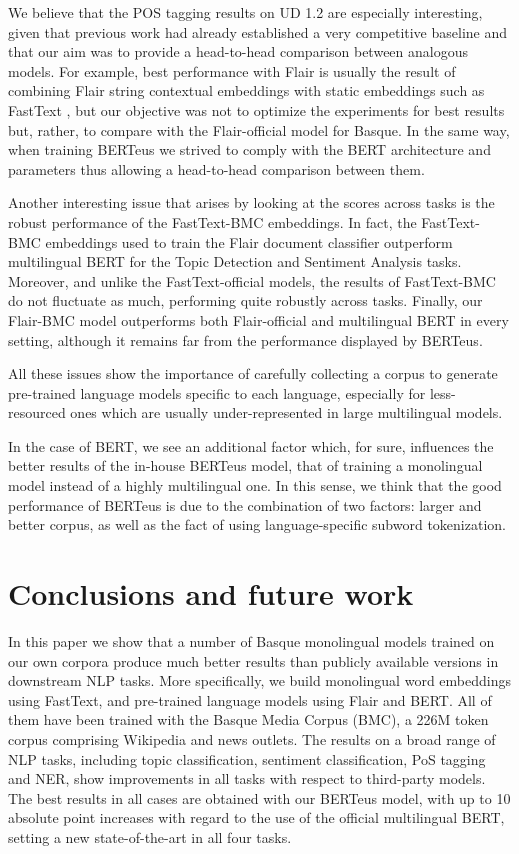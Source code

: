 \documentclass[10pt, a4paper]{article}
\begin{document}
We believe that the POS tagging results on UD 1.2 are especially interesting, given that previous work had already established a very competitive baseline \cite{heinzerling-strube-2019-sequence} and that our aim was to provide a head-to-head comparison between analogous models. For example, best performance with Flair is usually the result of combining Flair string contextual embeddings with static embeddings such as FastText \cite{akbik2018coling}, but our objective was not to optimize the experiments for best results but, rather, to compare with the Flair-official model for Basque. In the same way, when training BERTeus we strived to comply with the BERT architecture and parameters thus allowing a
head-to-head comparison between them.

Another interesting issue that arises by looking at the scores across tasks is the robust performance of the FastText-BMC embeddings. In fact, the FastText-BMC embeddings used to train the Flair document classifier outperform multilingual BERT for the Topic Detection and Sentiment Analysis tasks. Moreover, and unlike the FastText-official models, the results of FastText-BMC do not fluctuate as much, performing quite robustly across tasks. Finally, our Flair-BMC model outperforms both Flair-official and multilingual BERT in every setting, although it remains far from the performance displayed by BERTeus.


All these issues show the importance of carefully collecting a corpus to generate pre-trained language models specific to each language, especially for less-resourced ones which are usually under-represented in large multilingual models. 

In the case of BERT, we see an additional factor which, for sure, influences the better results of the in-house BERTeus model, that of training a monolingual model instead of a highly multilingual one. In this sense, we think that the good performance of BERTeus is due to the combination of two factors: larger and better corpus, as well as the fact of using language-specific subword tokenization.


\section{Conclusions and future work}\label{sec:concl-future-work}

In this paper we show that a number of Basque monolingual models trained on our own corpora produce much better results than publicly available versions in downstream NLP tasks. More specifically, we build monolingual word embeddings using FastText, and pre-trained language models using Flair and BERT. All of them have been trained with the Basque Media Corpus (BMC), a 226M token corpus comprising Wikipedia and news outlets. The results on a broad range of NLP tasks, including topic classification, sentiment classification, PoS tagging and NER, show improvements in all tasks with respect to third-party models. The best results in all cases are obtained with our BERTeus model, with up to 10 absolute point increases with regard to the use of the official multilingual BERT, setting a new state-of-the-art in all four tasks.
\end{document}
